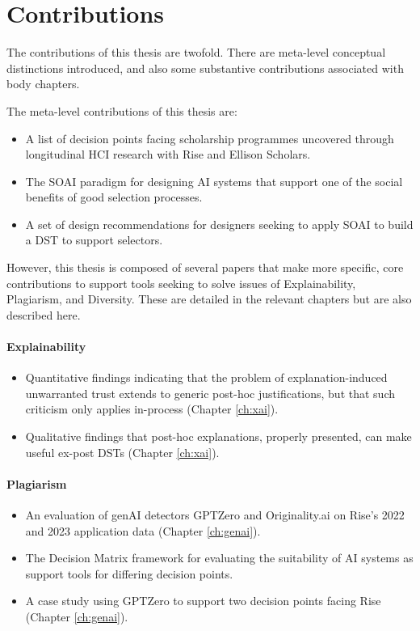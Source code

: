 \section{Contributions} 
The contributions of this thesis are twofold. There are meta-level conceptual distinctions introduced, and also some substantive contributions associated with body chapters.

The meta-level contributions of this thesis are:

\begin{itemize}
    \item A list of decision points facing scholarship programmes uncovered through longitudinal HCI research with Rise and Ellison Scholars.
    \item The SOAI paradigm for designing AI systems that support one of the social benefits of good selection processes.
    \item A set of design recommendations for designers seeking to apply SOAI to build a DST to support selectors.
\end{itemize}

However, this thesis is composed of several papers that make more specific, core contributions to support tools seeking to solve issues of Explainability, Plagiarism, and Diversity. These are detailed in the relevant chapters but are also described here.

\paragraph{Explainability}
\begin{itemize}
    \item Quantitative findings indicating that the problem of explanation-induced unwarranted trust extends to generic post-hoc justifications, but that such criticism only applies in-process (Chapter \ref{ch:xai}).
    \item Qualitative findings that post-hoc explanations, properly presented, can make useful ex-post DSTs (Chapter \ref{ch:xai}).
\end{itemize}

\paragraph{Plagiarism}
\begin{itemize}
    \item An evaluation of genAI detectors GPTZero and Originality.ai on Rise's 2022 and 2023 application data (Chapter \ref{ch:genai}).
    \item The Decision Matrix framework for evaluating the suitability of AI systems as support tools for differing decision points.
    \item A case study using GPTZero to support two decision points facing Rise (Chapter \ref{ch:genai}).
\end{itemize}

